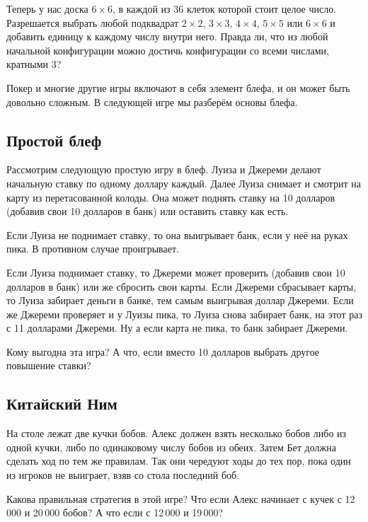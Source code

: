 Теперь у нас доска $6 \times 6$, в каждой из $36$ клеток которой стоит целое число.
Разрешается выбрать любой подквадрат $2 \times 2$, $3 \times 3$, $4 \times 4$, $5 \times 5$ или $6 \times 6$ и добавить единицу к каждому числу внутри него.
Правда ли, что из любой начальной конфигурации можно достичь конфигурации со всеми числами, кратными $3$?


\medskip

Покер и многие другие игры включают в себя элемент блефа, и он может быть довольно сложным.
В следующей игре мы разберём основы блефа.

\subsection*{Простой блеф}

Рассмотрим следующую простую игру в блеф.
Луиза и Джереми делают начальную ставку по одному доллару каждый.
Далее Луиза снимает и смотрит на карту из перетасованной колоды.
Она может поднять ставку на 10 долларов (добавив свои 10 долларов в банк) или оставить ставку как есть.

Если Луиза не поднимает ставку, то она выигрывает банк, если у неё на руках пика.
В противном случае проигрывает.

Если Луиза поднимает ставку, то Джереми может проверить (добавив свои 10 долларов в банк) или же сбросить свои карты.
Если Джереми сбрасывает карты, то Луиза забирает деньги в банке, тем самым выигрывая доллар Джереми.
Если же Джереми проверяет и у Луизы пика, то Луиза снова забирает банк, на этот раз с 11 долларами Джереми.
Ну а если карта не пика, то банк забирает Джереми.

Кому выгодна эта игра?
А что, если вместо 10 долларов выбрать другое повышение ставки?

\subsection*{Китайский Ним}

На столе лежат две кучки бобов.
Алекс должен взять несколько бобов либо из одной кучки, либо по одинаковому числу бобов из обеих.
Затем Бет должна сделать ход по тем же правилам.
Так они чередуют ходы до тех пор, пока один из игроков не выиграет, взяв со стола последний боб.

Какова правильная стратегия в этой игре?
Что если Алекс начинает с кучек с 12\,000 и 20\,000 бобов?
А что если с 12\,000 и 19\,000?

